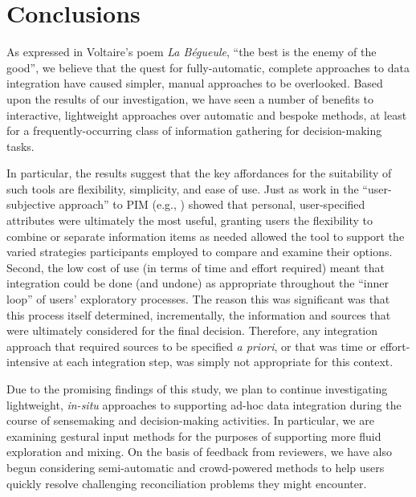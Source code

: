 \documentclass{sigchi}
\begin{document}
%
%
%

\section{Conclusions} %

As expressed in Voltaire's poem \emph{La B\'{e}gueule}, ``the best is the enemy of the good'', we believe that the quest for fully-automatic, complete approaches to data integration have caused simpler, manual approaches to be overlooked.  Based upon the results of our investigation, we have seen a number of benefits to interactive, lightweight approaches over automatic and bespoke methods, at least for a frequently-occurring class of information gathering for decision-making tasks.

In particular, the results suggest that the key affordances for the suitability of such tools are flexibility, simplicity, and ease of use.  Just as work in the ``user-subjective approach'' to PIM (e.g., \cite{user-subjective}) showed that personal, user-specified attributes were ultimately the most useful, granting users the flexibility to combine or separate information items as needed allowed the tool to support the varied strategies participants employed to compare and examine their options. Second, the low cost of use  (in terms of time and effort required) meant that integration could be done (and undone) as appropriate throughout the ``inner loop'' of users' exploratory processes.  The reason this was significant was that this process itself determined, incrementally, the information and sources that were ultimately considered for the final decision. Therefore, any integration approach that required sources to be specified \emph{a priori}, or that was time or effort-intensive at each integration step, was simply not appropriate for this context.

Due to the promising findings of this study, we plan to continue investigating lightweight, \emph{in-situ} approaches to supporting ad-hoc data integration during the course of sensemaking and decision-making activities.  In particular, we are examining gestural input methods for the purposes of supporting more fluid exploration and mixing.  On the basis of feedback from reviewers, we have also begun considering semi-automatic and crowd-powered methods to help users quickly resolve challenging reconciliation problems they might encounter.
\end{document}
